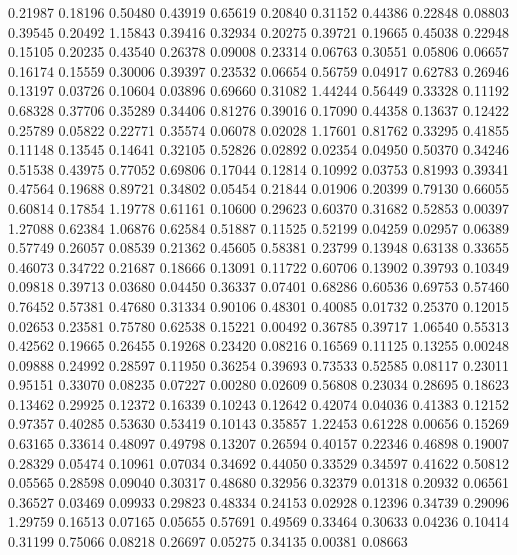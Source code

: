   0.21987 0.18196
  0.50480 0.43919
  0.65619 0.20840
  0.31152 0.44386
  0.22848 0.08803
  0.39545 0.20492
  1.15843 0.39416
  0.32934 0.20275
  0.39721 0.19665
  0.45038 0.22948
  0.15105 0.20235
  0.43540 0.26378
  0.09008 0.23314
  0.06763 0.30551
  0.05806 0.06657
  0.16174 0.15559
  0.30006 0.39397
  0.23532 0.06654
  0.56759 0.04917
  0.62783 0.26946
  0.13197 0.03726
  0.10604 0.03896
  0.69660 0.31082
  1.44244 0.56449
  0.33328 0.11192
  0.68328 0.37706
  0.35289 0.34406
  0.81276 0.39016
  0.17090 0.44358
  0.13637 0.12422
  0.25789 0.05822
  0.22771 0.35574
  0.06078 0.02028
  1.17601 0.81762
  0.33295 0.41855
  0.11148 0.13545
  0.14641 0.32105
  0.52826 0.02892
  0.02354 0.04950
  0.50370 0.34246
  0.51538 0.43975
  0.77052 0.69806
  0.17044 0.12814
  0.10992 0.03753
  0.81993 0.39341
  0.47564 0.19688
  0.89721 0.34802
  0.05454 0.21844
  0.01906 0.20399
  0.79130 0.66055
  0.60814 0.17854
  1.19778 0.61161
  0.10600 0.29623
  0.60370 0.31682
  0.52853 0.00397
  1.27088 0.62384
  1.06876 0.62584
  0.51887 0.11525
  0.52199 0.04259
  0.02957 0.06389
  0.57749 0.26057
  0.08539 0.21362
  0.45605 0.58381
  0.23799 0.13948
  0.63138 0.33655
  0.46073 0.34722
  0.21687 0.18666
  0.13091 0.11722
  0.60706 0.13902
  0.39793 0.10349
  0.09818 0.39713
  0.03680 0.04450
  0.36337 0.07401
  0.68286 0.60536
  0.69753 0.57460
  0.76452 0.57381
  0.47680 0.31334
  0.90106 0.48301
  0.40085 0.01732
  0.25370 0.12015
  0.02653 0.23581
  0.75780 0.62538
  0.15221 0.00492
  0.36785 0.39717
  1.06540 0.55313
  0.42562 0.19665
  0.26455 0.19268
  0.23420 0.08216
  0.16569 0.11125
  0.13255 0.00248
  0.09888 0.24992
  0.28597 0.11950
  0.36254 0.39693
  0.73533 0.52585
  0.08117 0.23011
  0.95151 0.33070
  0.08235 0.07227
  0.00280 0.02609
  0.56808 0.23034
  0.28695 0.18623
  0.13462 0.29925
  0.12372 0.16339
  0.10243 0.12642
  0.42074 0.04036
  0.41383 0.12152
  0.97357 0.40285
  0.53630 0.53419
  0.10143 0.35857
  1.22453 0.61228
  0.00656 0.15269
  0.63165 0.33614
  0.48097 0.49798
  0.13207 0.26594
  0.40157 0.22346
  0.46898 0.19007
  0.28329 0.05474
  0.10961 0.07034
  0.34692 0.44050
  0.33529 0.34597
  0.41622 0.50812
  0.05565 0.28598
  0.09040 0.30317
  0.48680 0.32956
  0.32379 0.01318
  0.20932 0.06561
  0.36527 0.03469
  0.09933 0.29823
  0.48334 0.24153
  0.02928 0.12396
  0.34739 0.29096
  1.29759 0.16513
  0.07165 0.05655
  0.57691 0.49569
  0.33464 0.30633
  0.04236 0.10414
  0.31199 0.75066
  0.08218 0.26697
  0.05275 0.34135
  0.00381 0.08663
